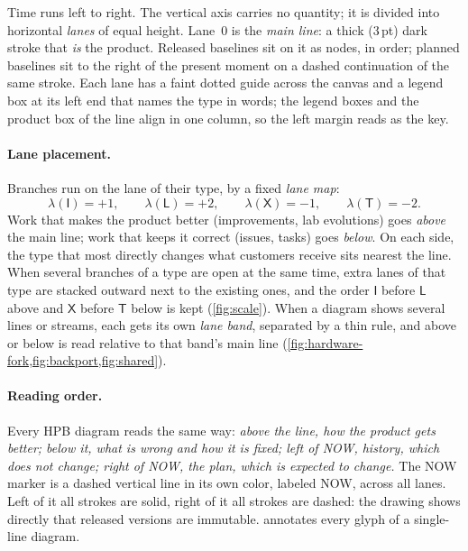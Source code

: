Time runs left to right. The vertical axis carries no quantity; it is
divided into horizontal \emph{lanes} of equal height. Lane~$0$ is the
\emph{main line}: a thick (3\,pt) dark stroke that \emph{is} the product.
Released baselines sit on it as nodes, in order; planned baselines sit to
the right of the present moment on a dashed continuation of the same
stroke. Each lane has a faint dotted guide across the canvas and a legend
box at its left end that names the type in words; the legend boxes and the
product box of the line align in one column, so the left margin reads as
the key.

\paragraph{Lane placement.}
Branches run on the lane of their type, by a fixed \emph{lane map}:
\begin{equation}
  \lambda(\mathsf{I}) = +1,\qquad
  \lambda(\mathsf{L}) = +2,\qquad
  \lambda(\mathsf{X}) = -1,\qquad
  \lambda(\mathsf{T}) = -2 .
  \label{eq:lanemap}
\end{equation}
Work that makes the product better (improvements, lab evolutions) goes
\emph{above} the main line; work that keeps it correct (issues, tasks)
goes \emph{below}. On each side, the type that most directly changes what
customers receive sits nearest the line. When several branches of a type
are open at the same time, extra lanes of that type are stacked outward
next to the existing ones, and the order $\mathsf{I}$ before $\mathsf{L}$
above and $\mathsf{X}$ before $\mathsf{T}$ below is kept
(\cref{fig:scale}). When a diagram shows several lines or streams, each
gets its own \emph{lane band}, separated by a thin rule, and above or below
is read relative to that band's main line
(\cref{fig:hardware-fork,fig:backport,fig:shared}).

\paragraph{Reading order.}
Every HPB diagram reads the same way: \emph{above the line, how the product
gets better; below it, what is wrong and how it is fixed; left of NOW,
history, which does not change; right of NOW, the plan, which is expected
to change.} The NOW marker is a dashed vertical line in its own color,
labeled \textsf{NOW}, across all lanes. Left of it all strokes are solid,
right of it all strokes are dashed: the drawing shows directly that
released versions are immutable.  annotates every glyph
of a single-line diagram.


